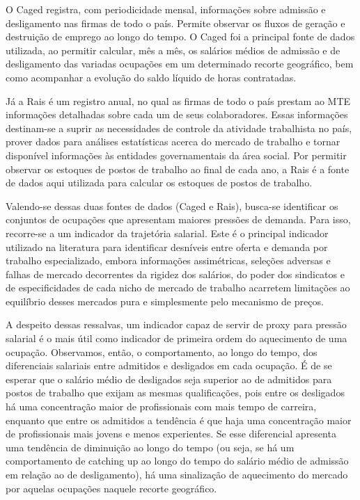 O Caged registra, com periodicidade mensal, informações sobre admissão e desligamento nas firmas de todo o país. Permite observar os fluxos de geração e destruição de emprego ao longo do tempo. O Caged foi a principal fonte de dados utilizada, ao permitir calcular, mês a mês, os salários médios de admissão e de desligamento das variadas ocupações em um determinado recorte geográfico, bem como acompanhar a evolução do saldo líquido de horas contratadas. 

Já a Rais é um registro anual, no qual as firmas de todo o país prestam ao MTE informações detalhadas sobre cada um de seus colaboradores. Essas informações destinam-se a suprir as necessidades de controle da atividade trabalhista no país, prover dados para análises estatísticas acerca do mercado de trabalho e tornar disponível informações às entidades governamentais da área social. Por permitir observar os estoques de postos de trabalho ao final de cada ano, a Rais é a fonte de dados aqui utilizada para calcular os estoques de postos de trabalho. 

Valendo-se dessas duas fontes de dados (Caged e Rais), busca-se identificar os conjuntos de ocupações que apresentam maiores pressões de demanda. Para isso, recorre-se a um indicador da trajetória salarial. Este é o principal indicador utilizado na literatura para identificar desníveis entre oferta e demanda por trabalho especializado, embora informações assimétricas, seleções adversas e falhas de mercado decorrentes da rigidez dos salários, do poder dos sindicatos e de especificidades de cada nicho de mercado de trabalho acarretem limitações ao equilíbrio desses mercados pura e simplesmente pelo mecanismo de preços. 

A despeito dessas ressalvas, um indicador capaz de servir de proxy para pressão salarial é o mais útil como indicador de primeira ordem do aquecimento de uma ocupação. Observamos, então, o comportamento, ao longo do tempo, dos diferenciais salariais entre admitidos e desligados em cada ocupação. É de se esperar que o salário médio de desligados seja superior ao de admitidos para postos de trabalho que exijam as mesmas qualificações, pois entre os desligados há uma concentração maior de profissionais com mais tempo de carreira, enquanto que entre os admitidos a tendência é que haja uma concentração maior de profissionais mais jovens e menos experientes. Se esse diferencial apresenta uma tendência de diminuição ao longo do tempo (ou seja, se há um comportamento de catching up ao longo do tempo do salário médio de admissão em relação ao de desligamento), há uma sinalização de aquecimento do mercado por aquelas ocupações naquele recorte geográfico. 

